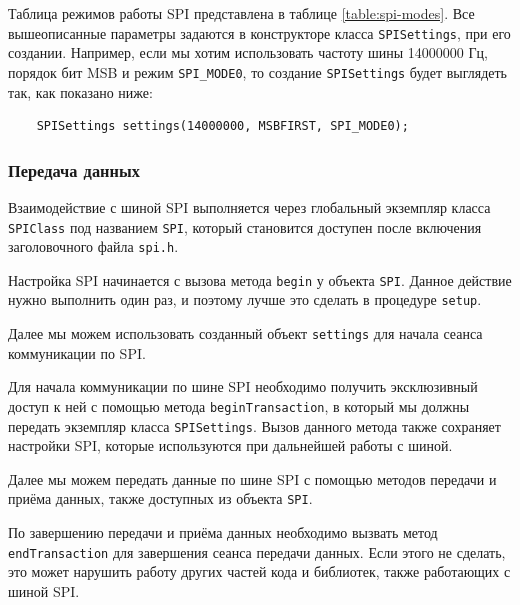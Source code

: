 \documentclass[../sparc.tex]{subfiles}
\begin{document}
Таблица режимов работы SPI представлена в таблице \ref{table:spi-modes}. Все
вышеописанные параметры задаются в конструкторе класса
\texttt{SPISettings}, при его создании.  Например, если мы хотим
использовать частоту шины 14000000 Гц, порядок бит MSB и режим
\texttt{SPI_MODE0}, то создание \texttt{SPISettings} будет
выглядеть так, как показано ниже:

\begin{listing}[H]
  \begin{verbatim}
    SPISettings settings(14000000, MSBFIRST, SPI_MODE0);
  \end{verbatim}
  \label{listing:communication-spi-settings}
  \caption{Создание \texttt{SPISettings} с нужными параметрами.}
\end{listing}

\subsubsection{Передача данных}

Взаимодействие с шиной SPI выполняется через глобальный экземпляр класса
\texttt{SPIClass} под названием \texttt{SPI}, который
становится доступен после включения заголовочного файла \texttt{spi.h}.

Настройка SPI начинается с вызова метода \texttt{begin} у объекта
\texttt{SPI}.  Данное действие нужно выполнить один раз, и поэтому
лучше это сделать в процедуре \texttt{setup}.

Далее мы можем использовать созданный объект \texttt{settings} для
начала сеанса коммуникации по SPI.

Для начала коммуникации по шине SPI необходимо получить эксклюзивный доступ к
ней с помощью метода \texttt{beginTransaction}, в который мы должны
передать экземпляр класса \texttt{SPISettings}.  Вызов данного метода
также сохраняет настройки SPI, которые используются при дальнейшей работы с
шиной.

Далее мы можем передать данные по шине SPI с помощью методов передачи и приёма
данных, также доступных из объекта \texttt{SPI}.

По завершению передачи и приёма данных необходимо вызвать метод\\
\texttt{endTransaction} для завершения сеанса передачи данных.  Если
этого не сделать, это может нарушить работу других частей кода и библиотек,
также работающих с шиной SPI.
\end{document}
